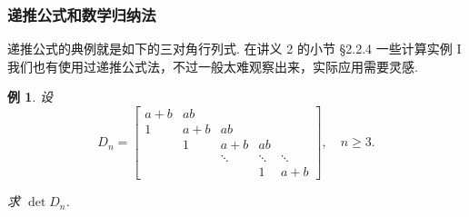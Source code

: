 \documentclass[10pt,openany]{article}
\theoremstyle{thmstyle} %
\theoremstyle{defstyle} %
\theoremstyle{prostyle} %
\theoremstyle{exastyle}
\newtheorem{example}[theorem]{例}
\theoremstyle{remstyle}
\begin{document}
\subsubsection{递推公式和数学归纳法}

递推公式的典例就是如下的三对角行列式. 在讲义 2 的小节 \S 2.2.4 一些计算实例 I 我们也有使用过递推公式法，不过一般太难观察出来，实际应用需要灵感.

\begin{example}
	设
	\[
	D_n =
	\begin{bmatrix}
		a+b & ab   &        &        &        \\
		1   & a+b  & ab     &        &        \\
		& 1    & a+b    & ab     &        \\
		&      & \ddots & \ddots & \ddots \\
		&      &        & 1      & a+b
	\end{bmatrix}, \quad n \geq 3.
	\]
	
	求 \( \det D_n \).
\end{example}
\end{document}
